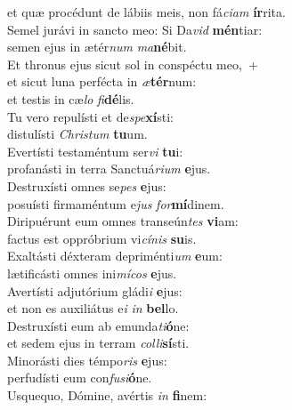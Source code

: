 \evenverse et quæ procédunt de lábiis meis, non fá\textit{ci}\textit{am} \textbf{ír}rita.\\
\oddverse Semel jurávi in sancto meo: Si Da\textit{vid} \textbf{mén}tiar:~\*\\
\oddverse semen ejus in ætér\textit{num} \textit{ma}\textbf{né}bit.\\
\evenverse Et thronus ejus sicut sol in conspéctu meo,~+\\
\evenverse  et sicut luna perfécta in \textit{æ}\textbf{tér}num:~\*\\
\evenverse et testis in cæ\textit{lo} \textit{fi}\textbf{dé}lis.\\
\oddverse Tu vero repulísti et de\textit{spe}\textbf{xí}sti:~\*\\
\oddverse distulísti \textit{Chri}\textit{stum} \textbf{tu}um.\\
\evenverse Evertísti testaméntum ser\textit{vi} \textbf{tu}i:~\*\\
\evenverse profanásti in terra Sanctuá\textit{ri}\textit{um} \textbf{e}jus.\\
\oddverse Destruxísti omnes se\textit{pes} \textbf{e}jus:~\*\\
\oddverse posuísti firmaméntum e\textit{jus} \textit{for}\textbf{mí}dinem.\\
\evenverse Diripuérunt eum omnes transeún\textit{tes} \textbf{vi}am:~\*\\
\evenverse factus est oppróbrium vi\textit{cí}\textit{nis} \textbf{su}is.\\
\oddverse Exaltásti déxteram depriménti\textit{um} \textbf{e}um:~\*\\
\oddverse lætificásti omnes ini\textit{mí}\textit{cos} \textbf{e}jus.\\
\evenverse Avertísti adjutórium gládi\textit{i} \textbf{e}jus:~\*\\
\evenverse et non es auxiliátus e\textit{i} \textit{in} \textbf{bel}lo.\\
\oddverse Destruxísti eum ab emunda\textit{ti}\textbf{ó}ne:~\*\\
\oddverse et sedem ejus in terram \textit{col}\textit{li}\textbf{sí}sti.\\
\evenverse Minorásti dies témpo\textit{ris} \textbf{e}jus:~\*\\
\evenverse perfudísti eum con\textit{fu}\textit{si}\textbf{ó}ne.\\
\oddverse Usquequo, Dómine, avértis \textit{in} \textbf{fi}nem:~\*\\
